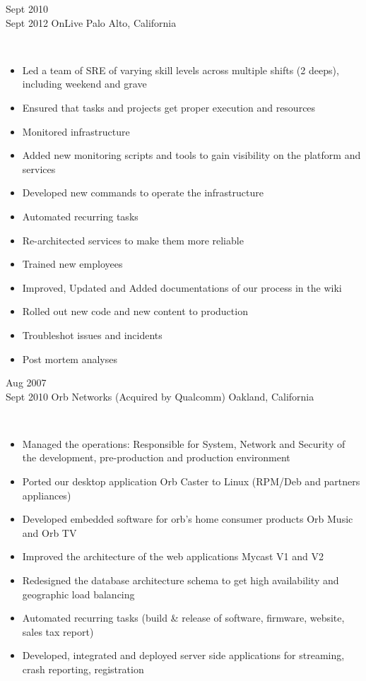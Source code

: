 \documentclass[]{cv-style}          %
\begin{document}
\begin{entrylist}
\entry
{Sept 2010\\Sept 2012}
{OnLive}
{Palo Alto, California}
{ \\
\begin{itemize}
\item Led a team of SRE of varying skill levels across multiple shifts (2 deeps), including weekend and grave
\item Ensured that tasks and projects get proper execution and resources
\item Monitored infrastructure
\item Added new monitoring scripts and tools to gain visibility on the platform and services
\item Developed new commands to operate the infrastructure 
\item Automated recurring tasks
\item Re-architected services to make them more reliable 
\item Trained new employees
\item Improved, Updated and Added documentations of our process in the wiki
\item Rolled out new code and new content to production 
\item Troubleshot issues and incidents
\item Post mortem analyses
\end{itemize}\vspace{+10pt}}
\entry
{Aug 2007\\Sept 2010}
{Orb Networks (Acquired by Qualcomm)}
{Oakland, California}
{ \\
\begin{itemize}
\item Managed the operations: Responsible for System, Network and Security of the development, pre-production and production environment
\item Ported our desktop application Orb Caster to Linux (RPM/Deb and partners appliances)
\item Developed embedded software for orb’s home consumer products Orb Music and Orb TV
\item Improved the architecture of the web applications Mycast V1 and V2
\item Redesigned the database architecture schema to get high availability and geographic load balancing
\item Automated recurring tasks (build \& release of software, firmware, website, sales tax report)
\item Developed, integrated and deployed server side applications for streaming, crash reporting, registration
\end{itemize}}
\end{entrylist}
\end{document}
